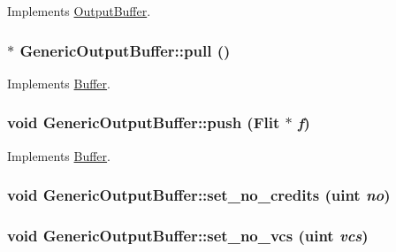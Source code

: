 Implements \hyperlink{classOutputBuffer_7cba09e2dbb3794d873862b5066fd085}{OutputBuffer}.\hypertarget{classGenericOutputBuffer_3c3f1b425635f59b0539805945ddb1bd}{
\subsubsection[{pull}]{ $\ast$ GenericOutputBuffer::pull ()}}
\label{classGenericOutputBuffer_3c3f1b425635f59b0539805945ddb1bd}




Implements \hyperlink{classBuffer_95f5c230f9c261bc13ddcfafcc340e7e}{Buffer}.\hypertarget{classGenericOutputBuffer_f2b4047e054df5bb9b624ce0b0bbf0e2}{
\subsubsection[{push}]{\setlength{\rightskip}{0pt plus 5cm}void GenericOutputBuffer::push ({\bf Flit} $\ast$ {\em f})}}
\label{classGenericOutputBuffer_f2b4047e054df5bb9b624ce0b0bbf0e2}




Implements \hyperlink{classBuffer_c9dce1860c655146f000df30314caaa9}{Buffer}.\hypertarget{classGenericOutputBuffer_632ffda3db2c9729e2d9d6d1645defb3}{
\subsubsection[{set\_\-no\_\-credits}]{\setlength{\rightskip}{0pt plus 5cm}void GenericOutputBuffer::set\_\-no\_\-credits ({\bf uint} {\em no})}}
\label{classGenericOutputBuffer_632ffda3db2c9729e2d9d6d1645defb3}


\hypertarget{classGenericOutputBuffer_a0dcb541c9d64d097a21dd8b290c3950}{
\subsubsection[{set\_\-no\_\-vcs}]{\setlength{\rightskip}{0pt plus 5cm}void GenericOutputBuffer::set\_\-no\_\-vcs ({\bf uint} {\em vcs})}}
\label{classGenericOutputBuffer_a0dcb541c9d64d097a21dd8b290c3950}




